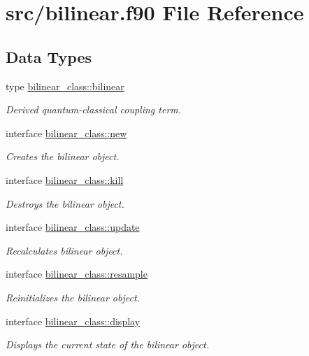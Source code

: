 \hypertarget{bilinear_8f90}{}\section{src/bilinear.f90 File Reference}
\label{bilinear_8f90}
\subsection*{Data Types}
\begin{DoxyCompactItemize}
\item 
type \hyperlink{structbilinear__class_1_1bilinear}{bilinear\+\_\+class\+::bilinear}
\begin{DoxyCompactList}\small\item\em Derived quantum-\/classical coupling term. \end{DoxyCompactList}\item 
interface \hyperlink{interfacebilinear__class_1_1new}{bilinear\+\_\+class\+::new}
\begin{DoxyCompactList}\small\item\em Creates the bilinear object. \end{DoxyCompactList}\item 
interface \hyperlink{interfacebilinear__class_1_1kill}{bilinear\+\_\+class\+::kill}
\begin{DoxyCompactList}\small\item\em Destroys the bilinear object. \end{DoxyCompactList}\item 
interface \hyperlink{interfacebilinear__class_1_1update}{bilinear\+\_\+class\+::update}
\begin{DoxyCompactList}\small\item\em Recalculates bilinear object. \end{DoxyCompactList}\item 
interface \hyperlink{interfacebilinear__class_1_1resample}{bilinear\+\_\+class\+::resample}
\begin{DoxyCompactList}\small\item\em Reinitializes the bilinear object. \end{DoxyCompactList}\item 
interface \hyperlink{interfacebilinear__class_1_1display}{bilinear\+\_\+class\+::display}
\begin{DoxyCompactList}\small\item\em Displays the current state of the bilinear object. \end{DoxyCompactList}\item 

\end{DoxyCompactItemize}
